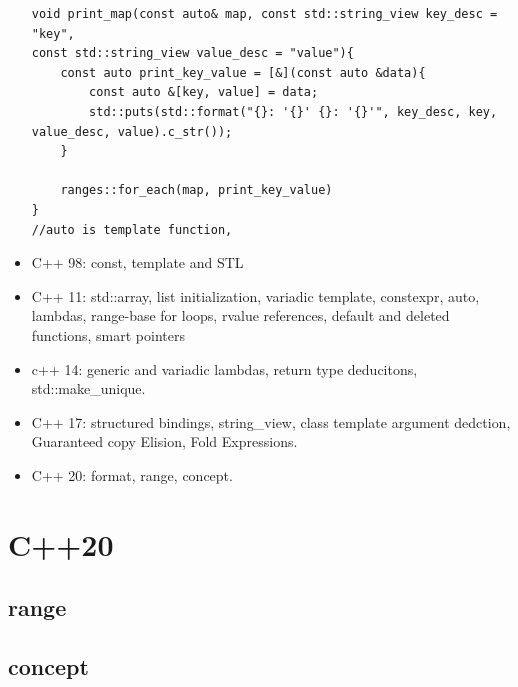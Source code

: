 \documentclass[a4paper,11pt,twoside]{book}
\begin{document}
\begin{itemize}
\begin{lstlisting}
void print_map(const auto& map, const std::string_view key_desc = "key",
const std::string_view value_desc = "value"){
	const auto print_key_value = [&](const auto &data){
		const auto &[key, value] = data;
		std::puts(std::format("{}: '{}' {}: '{}'", key_desc, key, value_desc, value).c_str());
	}
	
	ranges::for_each(map, print_key_value)		   
}	
//auto is template function, 
\end{lstlisting}	
\item C++ 98: const, template and STL
\item C++ 11: std::array, list initialization, variadic template, constexpr, auto, lambdas, range-base for loops, rvalue references, default and deleted functions, smart pointers
\item c++ 14: generic and variadic lambdas, return type deducitons, std::make\_unique.
\item C++ 17: structured bindings, string\_view, class template argument dedction, Guaranteed copy Elision, Fold Expressions.
\item C++ 20: format, range, concept. 

\end{itemize}

\section{C++20}
\subsection{range}
\begin{itemize}
\end{itemize}

\subsection{concept}
\end{document}
